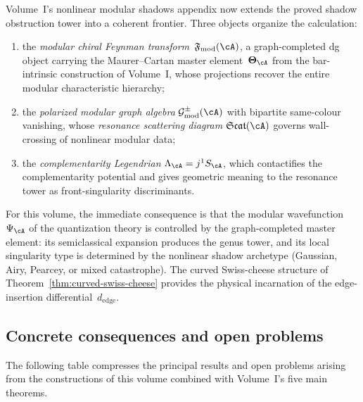 \begin{remark}
\label{rem:graph-completed-frontier}
Volume~I's nonlinear modular shadows appendix now extends the proved
shadow obstruction tower into a coherent frontier. Three objects
organize the calculation:
\begin{enumerate}[label=\textup{(\roman*)}]
\item the \emph{modular chiral Feynman
 transform}~$\mathfrak{F}_{\mathrm{mod}}(\cA)$, a graph-completed
 dg object carrying the Maurer--Cartan master
 element~$\boldsymbol\Theta_\cA$
 from the bar-intrinsic construction of Volume~I, whose projections recover
 the entire modular characteristic hierarchy;
\item the \emph{polarized modular graph algebra}
 $\mathcal{G}^{\pm}_{\mathrm{mod}}(\cA)$ with bipartite
 same-colour vanishing, whose \emph{resonance scattering diagram}
 $\mathfrak{Scat}(\cA)$ governs wall-crossing of nonlinear
 modular data;
\item the \emph{complementarity Legendrian}
 $\Lambda_\cA = j^1 S_\cA$, which contactifies the
 complementarity potential and gives geometric meaning to the
 resonance tower as front-singularity discriminants.
\end{enumerate}
For this volume, the immediate consequence is that the modular
wavefunction $\Psi_\cA$ of the quantization theory is controlled by
the graph-completed master element: its semiclassical expansion
produces the genus tower, and its local singularity type is determined
by the nonlinear shadow archetype (Gaussian, Airy, Pearcey, or mixed
catastrophe). The curved Swiss-cheese structure of
Theorem~\ref{thm:curved-swiss-cheese} provides the physical
incarnation of the edge-insertion differential~$d_{\mathrm{edge}}$.
\end{remark}

\subsection{Concrete consequences and open problems}

The following table compresses the principal results and open problems
arising from the constructions of this volume combined with Volume~I's
five main theorems.

